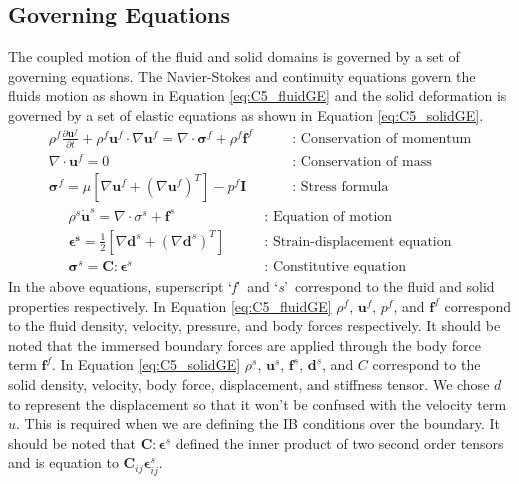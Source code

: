 \subsection{Governing Equations}
The coupled motion of the fluid and solid domains is governed by a set of governing equations. The Navier-Stokes and continuity equations govern the fluids motion as shown in Equation \eqref{eq:C5_fluidGE} and the solid deformation is governed by a set of elastic equations as shown in Equation \eqref{eq:C5_solidGE}.
%
\begin{subequations}\label{eq:C5_fluidGE}
\begin{align}
	\rho^f \frac{\partial \mathbf{u}^f}{\partial t} + 
	\rho^f \mathbf{u}^f \cdot \nabla \mathbf{u}^f = 
	\nabla \cdot \mathbf{\sigma}^f +
	\rho^f \mathbf{f}^f
	\quad \quad &\text{: Conservation of momentum}
	\\
	\nabla \cdot \mathbf{u}^f = 0
	\quad \quad &\text{: Conservation of mass}
	\\
	\mathbf{\sigma}^f = 
	\mu \left[ \nabla \mathbf{u}^f + \left( \nabla \mathbf{u}^f \right)^T \right] - 
	p^f \mathbf{I}
	\quad \quad &\text{: Stress formula}
\end{align}
\end{subequations}
%
\begin{subequations}\label{eq:C5_solidGE}
\begin{align}
	\rho^s \dot{\mathbf{u}}^s = 
	\nabla \cdot \sigma^s + \mathbf{f}^s
	\quad \quad &\text{: Equation of motion}
	\\
	\mathbf{\epsilon^s} = \frac{1}{2}
	                                 \left[ \nabla \mathbf{d}^s + \left( \nabla \mathbf{d}^s \right)^T \right]
	\quad \quad &\text{: Strain-displacement equation}
	\\
	\mathbf{\sigma}^s = \mathbf{C} : \mathbf{\epsilon}^s
	\quad \quad &\text{: Constitutive equation}
\end{align}
\end{subequations}
%
In the above equations, superscript \lq\emph{f}\rq\ and \lq\emph{s}\rq\ correspond to the fluid and solid properties respectively. In Equation \eqref{eq:C5_fluidGE} $\rho^f$, $\mathbf{u}^f$, $p^f$, and $\mathbf{f}^f$ correspond to the fluid density, velocity, pressure, and body forces respectively. It should be noted that the immersed boundary forces are applied through the body force term $\mathbf{f}^f$. In Equation \eqref{eq:C5_solidGE} $\rho^s$, $\mathbf{u}^s$, $\mathbf{f}^s$, $\mathbf{d}^s$, and $C$ correspond to the solid density, velocity, body force, displacement, and stiffness tensor. We chose $d$ to represent the displacement so that it won't be confused with the velocity term $u$. This is required when we are defining the IB conditions over the boundary. It should be noted that $\mathbf{C} : \mathbf{\epsilon}^s$ defined the inner product of two second order tensors and is equation to $\mathbf{C}_{ij} \mathbf{\epsilon}_{ij}^s$.


